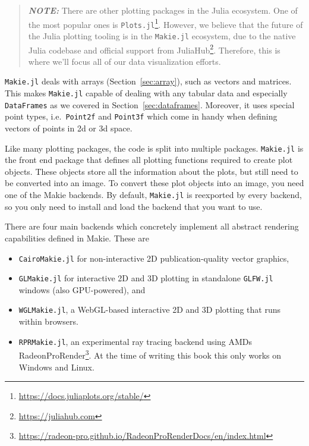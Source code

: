 \documentclass[
  notoc %
]{tufte-book}
\DeclareRobustCommand{\href}[2]{#2\footnote{\url{#1}}}
\providecommand{\tightlist}{%
  \setlength{\itemsep}{0pt}\setlength{\parskip}{0pt}
}
\newcommand{\passthrough}[1]{#1}
\begin{document}
\begin{quote}
\textbf{\emph{NOTE:}} There are other plotting packages in the Julia
ecosystem. One of the most popular ones is
\href{https://docs.juliaplots.org/stable/}{\passthrough{\lstinline!Plots.jl!}}.
However, we believe that the future of the Julia plotting tooling is in
the \passthrough{\lstinline!Makie.jl!} ecosystem, due to the native
Julia codebase and official support from
\href{https://juliahub.com}{JuliaHub}. Therefore, this is where we'll
focus all of our data visualization efforts.
\end{quote}

\passthrough{\lstinline!Makie.jl!} deals with arrays
(Section~\ref{sec:array}), such as vectors and matrices. This makes
\passthrough{\lstinline!Makie.jl!} capable of dealing with any tabular
data and especially \passthrough{\lstinline!DataFrames!} as we covered
in Section~\ref{sec:dataframes}. Moreover, it uses special point types,
i.e.~\passthrough{\lstinline!Point2f!} and
\passthrough{\lstinline!Point3f!} which come in handy when defining
vectors of points in 2d or 3d space.

Like many plotting packages, the code is split into multiple packages.
\passthrough{\lstinline!Makie.jl!} is the front end package that defines
all plotting functions required to create plot objects. These objects
store all the information about the plots, but still need to be
converted into an image. To convert these plot objects into an image,
you need one of the Makie backends. By default,
\passthrough{\lstinline!Makie.jl!} is reexported by every backend, so
you only need to install and load the backend that you want to use.

There are four main backends which concretely implement all abstract
rendering capabilities defined in Makie. These are

\begin{itemize}
\tightlist
\item
  \passthrough{\lstinline!CairoMakie.jl!} for non-interactive 2D
  publication-quality vector graphics,
\item
  \passthrough{\lstinline!GLMakie.jl!} for interactive 2D and 3D
  plotting in standalone \passthrough{\lstinline!GLFW.jl!} windows (also
  GPU-powered), and
\item
  \passthrough{\lstinline!WGLMakie.jl!}, a WebGL-based interactive 2D
  and 3D plotting that runs within browsers.
\item
  \passthrough{\lstinline!RPRMakie.jl!}, an experimental ray tracing
  backend using AMDs
  \href{https://radeon-pro.github.io/RadeonProRenderDocs/en/index.html}{RadeonProRender}.
  At the time of writing this book this only works on Windows and Linux.
\end{itemize}
\end{document}
